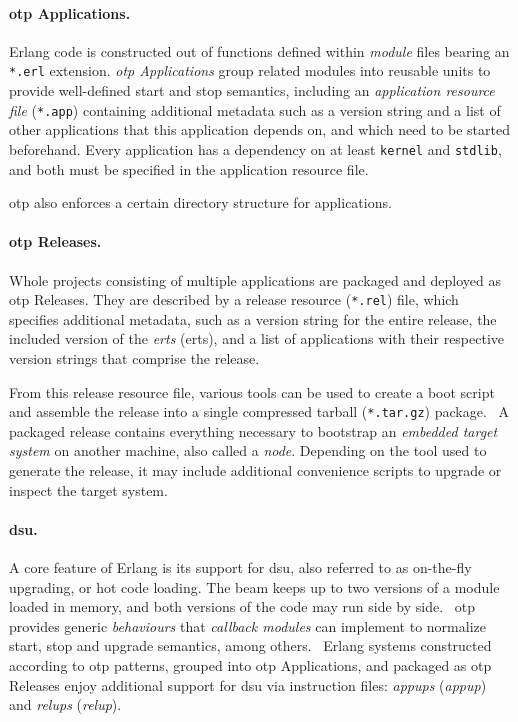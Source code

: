 \paragraph{\acrshort{otp} Applications.}
Erlang code is constructed out of functions defined within \mbox{\emph{module}} files bearing an \lstinline|*.erl| extension. \emph{\acrshort{otp} Applications} group related modules into reusable units to provide well-defined start and stop semantics, including an \emph{application resource file} (\lstinline|*.app|) containing additional metadata such as a version string and a list of other applications that this application depends on, and which need to be started beforehand. Every application has a dependency on at least \lstinline|kernel| and \lstinline|stdlib|, and both must be specified in the application resource file.~\cite{doc:otp}

\acrshort{otp} also enforces a certain directory structure for applications.~\cite{logan:otp}

\paragraph{\acrshort{otp} Releases.} Whole projects consisting of multiple applications are packaged and deployed as \acrshort{otp} Releases. They are described by a release resource (\lstinline|*.rel|) file, which specifies additional metadata, such as a version string for the entire release, the included version of the \emph{\acrlong{erts}} (\acrshort{erts}), and a list of applications with their respective version strings that comprise the release.

From this release resource file, various tools can be used to create a boot script and assemble the release into a single compressed tarball (\lstinline|*.tar.gz|) package.~\cite{doc:otp} A packaged release contains everything necessary to bootstrap an \emph{embedded target system} on another machine, also called a \emph{node}. Depending on the tool used to generate the release, it may include additional convenience scripts to upgrade or inspect the target system.

\paragraph{\acrlong{dsu}.} A core feature of Erlang is its support for \acrfull{dsu}, also referred to as on-the-fly upgrading, or hot code loading. The \acrshort{beam} keeps up to two versions of a module loaded in memory, and both versions of the code may run side by side.~\cite{cesarini:otp} \acrshort{otp} provides generic \emph{behaviours} that \emph{callback modules} can implement to normalize start, stop and upgrade semantics, among others.~\cite{doc:otp} Erlang systems constructed according to \acrshort{otp} patterns, grouped into \acrshort{otp} Applications, and packaged as \acrshort{otp} Releases enjoy additional support for \acrshort{dsu} via instruction files: \emph{\acrshort{appup}s} (\emph{\acrlong{appup}}) and \emph{\acrshort{relup}s} (\emph{\acrlong{relup}}).


